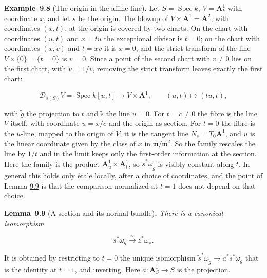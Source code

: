 \documentclass[11pt]{article}
\newenvironment{bpstatement}[2]{\par\addvspace{0.6\baselineskip}\noindent\textbf{#1}#2\textbf{.}\enspace\ignorespaces}
  {\par\addvspace{0.4\baselineskip}}
\newenvironment{bpstatementit}[2]{\begin{bpstatement}{#1}{#2}\itshape\ignorespaces}{\end{bpstatement}}
\begin{document}
\label{bp28}%
\begin{bpstatement}{Example~9.8}{ (The origin in the affine line)}
Let \(S=\operatorname{Spec}k\), \(V=\mathbf A^1_k\) with coordinate \(x\), and let \(s\) be the origin. The blowup of \(V\times\mathbf A^1=\mathbf A^2\), with coordinates \((x,t)\), at the origin is covered by two charts. On the chart with coordinates \((u,t)\) and \(x=tu\) the exceptional divisor is \(t=0\); on the chart with coordinates \((x,v)\) and \(t=xv\) it is \(x=0\), and the strict transform of the line \(V\times\{0\}=\{t=0\}\) is \(v=0\). Since a point of the second chart with \(v\neq0\) lies on the first chart, with \(u=1/v\), removing the strict transform leaves exactly the first chart:

\[
\mathcal D_{s(S)}V=\operatorname{Spec}k[u,t]\longrightarrow
V\times\mathbf A^1,\qquad (u,t)\longmapsto(tu,t),
\]

with \(\widetilde g\) the projection to \(t\) and \(\widetilde s\) the line \(u=0\). For \(t=c\neq0\) the fibre is the line \(V\) itself, with coordinate \(u=x/c\) and the origin as section. For \(t=0\) the fibre is the \(u\)-line, mapped to the origin of \(V\); it is the tangent line \(N_s=T_0\mathbf A^1\), and \(u\) is the linear coordinate given by the class of \(x\) in \(\mathfrak m/\mathfrak m^2\). So the family rescales the line by \(1/t\) and in the limit keeps only the first-order information at the section. Here the family is the product \(\mathbf A^1_u\times\mathbf A^1_t\), so \(\widetilde s^*\omega_{\widetilde g}\) is visibly constant along \(t\). In general this holds only étale locally, after a choice of coordinates, and the point of Lemma \hyperref[bp29]{9.9} is that the comparison normalized at \(t=1\) does not depend on that choice.
\end{bpstatement}

\label{bp29}%
\begin{bpstatementit}{Lemma~9.9}{ (A section and its normal bundle)}
There is a canonical isomorphism

\[
s^{*}\omega_{g}\xrightarrow{\sim}z^{*}\omega_{\pi}.
\tag{9.13}
\]

It is obtained by restricting to \(t=0\) the unique isomorphism \(\widetilde s^{*}\omega_{\widetilde g}\to a^{*}s^{*}\omega_{g}\) that is the identity at \(t=1\), and inverting. Here \(a:\mathbf A^1_S\to S\) is the projection.
\end{bpstatementit}
\end{document}
